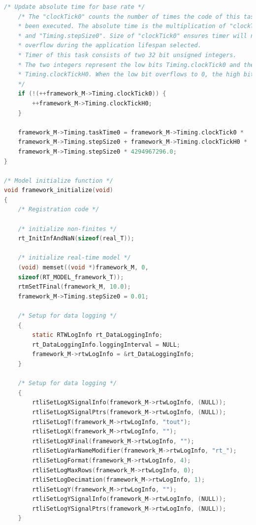 \begin{lstlisting}[caption={Automatically generated C code}, language=c,firstnumber=407,label={lst:acg2}]
	/* Update absolute time for base rate */
	/* The "clockTick0" counts the number of times the code of this task has
	* been executed. The absolute time is the multiplication of "clockTick0"
	* and "Timing.stepSize0". Size of "clockTick0" ensures timer will not
	* overflow during the application lifespan selected.
	* Timer of this task consists of two 32 bit unsigned integers.
	* The two integers represent the low bits Timing.clockTick0 and the high bits
	* Timing.clockTickH0. When the low bit overflows to 0, the high bits increment.
	*/
	if (!(++framework_M->Timing.clockTick0)) {
		++framework_M->Timing.clockTickH0;
	}
	
	framework_M->Timing.taskTime0 = framework_M->Timing.clockTick0 *
	framework_M->Timing.stepSize0 + framework_M->Timing.clockTickH0 *
	framework_M->Timing.stepSize0 * 4294967296.0;
}

/* Model initialize function */
void framework_initialize(void)
{
	/* Registration code */
	
	/* initialize non-finites */
	rt_InitInfAndNaN(sizeof(real_T));
	
	/* initialize real-time model */
	(void) memset((void *)framework_M, 0,
	sizeof(RT_MODEL_framework_T));
	rtmSetTFinal(framework_M, 10.0);
	framework_M->Timing.stepSize0 = 0.01;
	
	/* Setup for data logging */
	{
		static RTWLogInfo rt_DataLoggingInfo;
		rt_DataLoggingInfo.loggingInterval = NULL;
		framework_M->rtwLogInfo = &rt_DataLoggingInfo;
	}
	
	/* Setup for data logging */
	{
		rtliSetLogXSignalInfo(framework_M->rtwLogInfo, (NULL));
		rtliSetLogXSignalPtrs(framework_M->rtwLogInfo, (NULL));
		rtliSetLogT(framework_M->rtwLogInfo, "tout");
		rtliSetLogX(framework_M->rtwLogInfo, "");
		rtliSetLogXFinal(framework_M->rtwLogInfo, "");
		rtliSetLogVarNameModifier(framework_M->rtwLogInfo, "rt_");
		rtliSetLogFormat(framework_M->rtwLogInfo, 4);
		rtliSetLogMaxRows(framework_M->rtwLogInfo, 0);
		rtliSetLogDecimation(framework_M->rtwLogInfo, 1);
		rtliSetLogY(framework_M->rtwLogInfo, "");
		rtliSetLogYSignalInfo(framework_M->rtwLogInfo, (NULL));
		rtliSetLogYSignalPtrs(framework_M->rtwLogInfo, (NULL));
	}
	
	\end{lstlisting}

